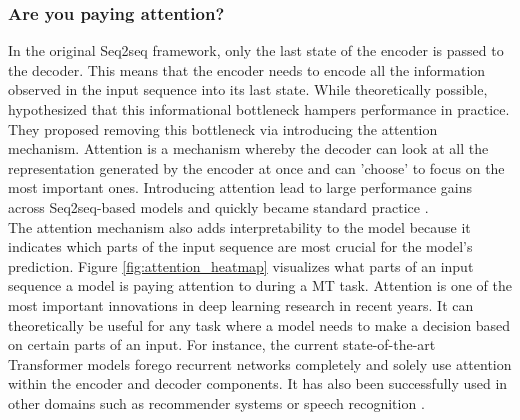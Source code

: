 \subsubsection{Are you paying attention?}
In the original Seq2seq framework, only the last state of the encoder is passed to the decoder. This means that the encoder needs to encode all the information observed in the input sequence into its last state. While theoretically possible, \cite{attention} hypothesized that this informational bottleneck hampers performance in practice. They proposed removing this bottleneck via introducing the attention mechanism. Attention is a mechanism whereby the decoder can look at all the representation generated by the encoder at once and can 'choose' to focus on the most important ones. Introducing attention lead to large performance gains across Seq2seq-based models and quickly became standard practice \cite{attentionforms}. \\
The attention mechanism also adds interpretability to the model because it indicates which parts of the input sequence are most crucial for the model's prediction. Figure \ref{fig:attention_heatmap} visualizes what parts of an input sequence a model is paying attention to during a MT task. Attention is one of the most important innovations in deep learning research in recent years. It can theoretically be useful for any task where a model needs to make a decision based on certain parts of an input. For instance, the current state-of-the-art Transformer models \cite{allyouneed} \cite{bert} \cite{gpt3} forego recurrent networks completely and solely use attention within the encoder and decoder components. It has also been successfully used in other domains such as recommender systems \cite{attention_recommender_systems} or speech recognition \cite{attention_speech_recognition}. 
 


